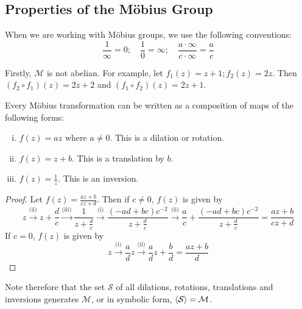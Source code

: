 \documentclass{article}
\begin{document}
	\subsection{Properties of the M\"obius Group}
	When we are working with M\"obius groups, we use the following conventions:
	\[ \frac{1}{\infty} = 0;\quad \frac{1}{0} = \infty;\quad \frac{a\cdot\infty}{c\cdot\infty} = \frac{a}{c} \]

	Firstly, $\mathcal M$ is not abelian. For example, let $f_1(z) = z + 1; f_2(z) = 2z$. Then $(f_2 \circ f_1)(z) = 2z + 2$ and $(f_1 \circ f_2)(z) = 2z + 1$.

	\begin{proposition}
		Every M\"obius transformation can be written as a composition of maps of the following forms:
		\begin{enumerate}[(i)]
			\item $f(z) = az$ where $a\neq 0$. This is a dilation or rotation.
			\item $f(z) = z + b$. This is a translation by $b$.
			\item $f(z) = \frac{1}{z}$. This is an inversion.
		\end{enumerate}
	\end{proposition}
	\begin{proof}
		Let $f(z) = \frac{az + b}{cz + d}$. Then if $c \neq 0$, $f(z)$ is given by
		\[ z \xrightarrow{\text{(ii)}} z + \frac{d}{c} \xrightarrow{\text{(iii)}} \frac{1}{z + \frac{d}{c}} \xrightarrow{\text{(i)}} \frac{(-ad+bc)c^{-2}}{z + \frac{d}{c}} \xrightarrow{\text{(ii)}} \frac{a}{c} + \frac{(-ad+bc)c^{-2}}{z + \frac{d}{c}} = \frac{az + b}{cz + d} \]
		If $c = 0$, $f(z)$ is given by
		\[ z \xrightarrow{\text{(i)}} \frac{a}{d}z \xrightarrow{\text{(ii)}} \frac{a}{d}z + \frac{b}{d} = \frac{az + b}{d} \]
	\end{proof}
	Note therefore that the set $\mathcal S$ of all dilations, rotations, translations and inversions generates $\mathcal M$, or in symbolic form, $\langle \mathcal S \rangle = \mathcal M$.
\end{document}
